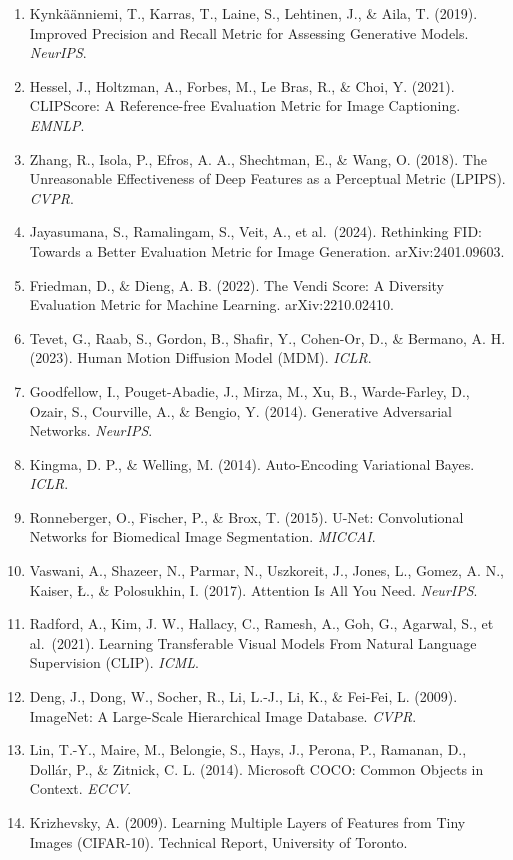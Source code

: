 \begin{enumerate}
\item
  Kynkäänniemi, T., Karras, T., Laine, S., Lehtinen, J., \& Aila, T. (2019). Improved Precision and Recall Metric for Assessing Generative Models. \emph{NeurIPS}.
\item
  Hessel, J., Holtzman, A., Forbes, M., Le Bras, R., \& Choi, Y. (2021). CLIPScore: A Reference-free Evaluation Metric for Image Captioning. \emph{EMNLP}.
\item
  Zhang, R., Isola, P., Efros, A. A., Shechtman, E., \& Wang, O. (2018). The Unreasonable Effectiveness of Deep Features as a Perceptual Metric (LPIPS). \emph{CVPR}.
\item
  Jayasumana, S., Ramalingam, S., Veit, A., et al.~(2024). Rethinking FID: Towards a Better Evaluation Metric for Image Generation. arXiv:2401.09603.
\item
  Friedman, D., \& Dieng, A. B. (2022). The Vendi Score: A Diversity Evaluation Metric for Machine Learning. arXiv:2210.02410.
\item
  Tevet, G., Raab, S., Gordon, B., Shafir, Y., Cohen-Or, D., \& Bermano, A. H. (2023). Human Motion Diffusion Model (MDM). \emph{ICLR}.
\item
  Goodfellow, I., Pouget-Abadie, J., Mirza, M., Xu, B., Warde-Farley, D., Ozair, S., Courville, A., \& Bengio, Y. (2014). Generative Adversarial Networks. \emph{NeurIPS}.
\item
  Kingma, D. P., \& Welling, M. (2014). Auto-Encoding Variational Bayes. \emph{ICLR}.
\item
  Ronneberger, O., Fischer, P., \& Brox, T. (2015). U-Net: Convolutional Networks for Biomedical Image Segmentation. \emph{MICCAI}.
\item
  Vaswani, A., Shazeer, N., Parmar, N., Uszkoreit, J., Jones, L., Gomez, A. N., Kaiser, Ł., \& Polosukhin, I. (2017). Attention Is All You Need. \emph{NeurIPS}.
\item
  Radford, A., Kim, J. W., Hallacy, C., Ramesh, A., Goh, G., Agarwal, S., et al.~(2021). Learning Transferable Visual Models From Natural Language Supervision (CLIP). \emph{ICML}.
\item
  Deng, J., Dong, W., Socher, R., Li, L.-J., Li, K., \& Fei-Fei, L. (2009). ImageNet: A Large-Scale Hierarchical Image Database. \emph{CVPR}.
\item
  Lin, T.-Y., Maire, M., Belongie, S., Hays, J., Perona, P., Ramanan, D., Dollár, P., \& Zitnick, C. L. (2014). Microsoft COCO: Common Objects in Context. \emph{ECCV}.
\item
  Krizhevsky, A. (2009). Learning Multiple Layers of Features from Tiny Images (CIFAR-10). Technical Report, University of Toronto.

\end{enumerate}
